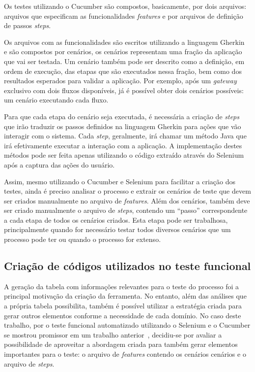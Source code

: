 \documentclass[12pt]{article}
\begin{document}
Os testes utilizando o Cucumber são compostos, basicamente, por dois arquivos: arquivos que especificam as funcionalidades \emph{features} e por arquivos de definição de passos \emph{steps}. 

Os arquivos com as funcionalidades são escritos utilizando a linguagem Gherkin~\cite{gherkin} e são compostos por cenários, os cenários representam uma fração da aplicação que vai ser testada. Um cenário também pode ser descrito como a definição, em ordem de execução, das etapas que são executados nessa fração, bem como dos resultados esperados para validar a aplicação. Por exemplo, após um \emph{gateway} exclusivo com dois fluxos disponíveis, já é possível obter dois cenários possíveis: um cenário executando cada fluxo.

Para que cada etapa do cenário seja executada, é necessária a criação de \emph{steps} que irão traduzir os passos definidos na linguagem Gherkin para ações que vão interagir com o sistema. Cada \emph{step}, geralmente, irá chamar um método Java que irá efetivamente executar a interação com a aplicação. A implementação destes métodos pode ser feita apenas utilizando o código extraído através do Selenium após a captura das ações do usuário.

Assim, mesmo utilizando o Cucumber e Selenium para facilitar a criação dos testes, ainda é preciso analisar o processo e extrair os cenários de teste que devem ser criados manualmente no arquivo de \emph{features}. Além dos cenários, também deve ser criado manualmente o arquivo de \emph{steps}, contendo um ``passo'' correspondente a cada etapa de todos os cenários criados. Esta etapa pode ser trabalhosa, principalmente quando for necessário testar todos diversos cenários que um processo pode ter ou quando o processo for extenso.

\subsection{Criação de códigos utilizados no teste funcional}
A geração da tabela com informações relevantes para o teste do processo foi a principal motivação da criação da ferramenta. No entanto, além das análises que a própria tabela possibilita, também é possível utilizar a estratégia criada para gerar outros elementos conforme a necessidade de cada domínio. No caso deste trabalho, por o teste funcional automatizado utilizando o Selenium e o Cucumber se mostrou promissor em um trabalho anterior~\cite{sbqs2015}, decidiu-se por avaliar a possibilidade de aproveitar a abordagem criada para também gerar elementos importantes para o teste: o arquivo de \emph{features} contendo os cenários cenários e o arquivo de \emph{steps}.
\end{document}
